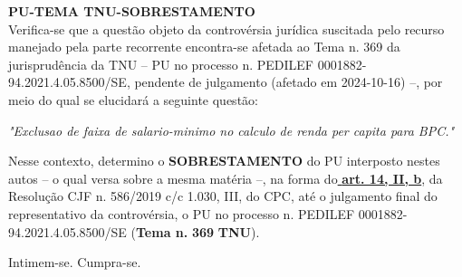 \documentclass[12pt]{article}
\begin{document}
\justifying
{\Large\bfseries \textbf{PU-TEMA TNU-SOBRESTAMENTO}}\\

\noindent Verifica-se que a questão objeto da controvérsia jurídica suscitada pelo recurso manejado pela parte recorrente encontra-se afetada ao Tema n. 369 da jurisprudência da TNU – PU no processo n. PEDILEF 0001882-94.2021.4.05.8500/SE, pendente de julgamento (afetado em 2024-10-16) –, por meio do qual se elucidará a seguinte questão:

\noindent \textit{"Exclusao de faixa de salario-minimo no calculo de renda per capita para BPC."}

\noindent Nesse contexto, determino o \textbf{SOBRESTAMENTO} do PU interposto nestes autos – o qual versa sobre a mesma matéria –, na forma do\uline{\textbf{ art. 14, II, b}}, da Resolução CJF n. 586/2019 c/c 1.030, III, do CPC, até o julgamento final do representativo da controvérsia, o PU no processo n. PEDILEF 0001882-94.2021.4.05.8500/SE (\textbf{Tema n. }\textbf{369 }\textbf{TNU}).

\noindent Intimem-se. Cumpra-se.
\end{document}
